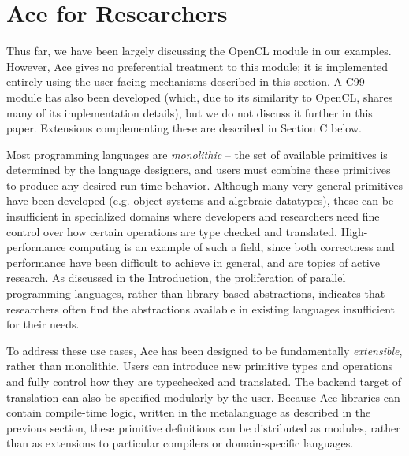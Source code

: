 \documentclass{sig-alternate}
\begin{document}
\section{Ace for Researchers}
Thus far, we have been largely discussing the OpenCL module in our examples. However, Ace gives no preferential treatment to this module; it is implemented entirely using the user-facing mechanisms described in this section. A C99 module has also been developed (which, due to its similarity to OpenCL, shares many of its implementation details), but we do not discuss it further in this paper. Extensions complementing these are described in Section C below.

Most programming languages are {\em monolithic} -- the set of available primitives is determined by the language designers, and users must combine these primitives to produce any desired run-time behavior. Although many very general primitives have been developed (e.g. object systems and algebraic datatypes), these can be insufficient in specialized domains where developers and researchers need fine control over how certain operations are type checked and translated. High-performance computing is an example of such a field, since both correctness and performance have been difficult to achieve in general, and are topics of active research. As discussed in the Introduction, the proliferation of parallel programming languages, rather than library-based abstractions, indicates that researchers often find the abstractions available in existing languages insufficient for their needs.

To address these use cases, Ace has been designed to be fundamentally {\em extensible}, rather than monolithic. Users can introduce new primitive types and operations and fully control how they are typechecked and translated. The backend target of translation can also be specified modularly by the user. Because Ace libraries can contain compile-time logic, written in the metalanguage as described in the previous section, these primitive definitions can be distributed as modules, rather than as extensions to particular compilers or domain-specific languages.
\end{document}
